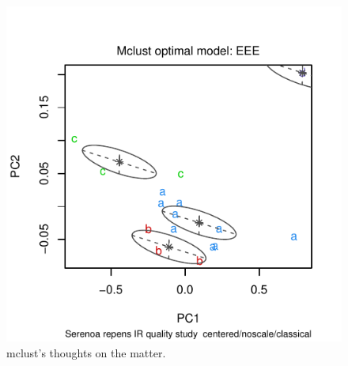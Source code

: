\documentclass[letter,10pt,twocolumn,twoside,printwatermark=false]{pinp}
\begin{document}
\begin{figure}

{\centering \includegraphics{ChemoSpec2_files/figure-latex/Chunk36-1} 

}

\caption{\label{mclust2}mclust's thoughts on the matter.}\label{fig:Chunk36}
\end{figure}

\begin{Shaded}
\begin{Highlighting}[]
\StringTok{ }
   \NormalTok{,}
  \OperatorTok{$}
\end{Highlighting}
\end{Shaded}
\end{document}
